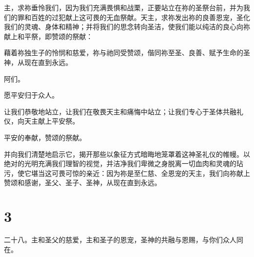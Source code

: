 主，求祢垂怜我们，因为我们充满畏惧和战栗，正要站立在祢的圣祭台前，并为我们的罪和百姓的过犯献上这可畏的无血祭献。天主，求祢发出祢的良善恩宠，圣化我们的灵魂、身体和精神；并将我们的思念转向圣洁，使我们能以纯洁的良心向祢献上和平祭，即赞颂的祭献：\par

\par

藉着祢独生子的怜悯和慈爱，祢与祂同受赞颂，偕同祢至圣、良善、赋予生命的圣神，从现在直到永远。\par

\par

阿们。\par

\par

愿平安归于众人。\par

\par

让我们恭敬地站立，让我们在敬畏天主和痛悔中站立；让我们专心于圣体共融礼仪，向天主献上平安祭。\par

\par

平安的奉献，赞颂的祭献。\par

\par

并向我们清楚地启示它，揭开那些以象征方式暗晦地笼罩着这神圣礼仪的帷幔。以绝对的光明充满我们理智的视觉，并洁净我们卑微之身脱离一切血肉和灵魂的玷污，使它堪当这可畏可惊的亲近：因为祢是至仁慈、全恩宠的天主，我们向祢献上赞颂和感谢，圣父、圣子、圣神，从现在直到永远。\par


\section{3}

\par

\par

二十八。主和圣父的慈爱，主和圣子的恩宠，圣神的共融与恩赐，与你们众人同在。\par

